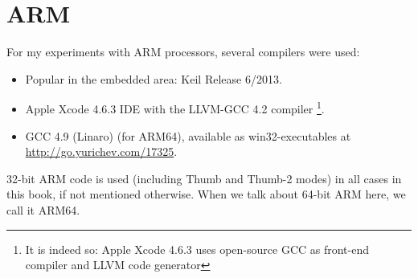 \section{ARM}
\label{sec:hw_ARM}

\myindex{\idevices}
For my experiments with ARM processors, several compilers were used:

\begin{itemize}
\item Popular in the embedded area: Keil Release 6/2013.

\item Apple Xcode 4.6.3 IDE with the LLVM-GCC 4.2 compiler
\footnote{It is indeed so: Apple Xcode 4.6.3 uses open-source GCC as front-end compiler and LLVM 
code generator}.

\item GCC 4.9 (Linaro) (for ARM64), available as win32-executables at \url{http://go.yurichev.com/17325}.

\end{itemize}

32-bit ARM code is used (including Thumb and Thumb-2 modes) in all cases in this book, if not mentioned otherwise.
When we talk about 64-bit ARM here, we call it ARM64.







